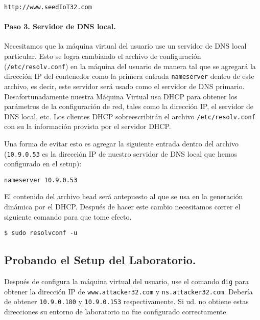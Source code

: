 \begin{lstlisting}
http://www.seedIoT32.com
\end{lstlisting}
 

\paragraph{Paso 3. Servidor de DNS local.}
Necesitamos que la máquina virtual del usuario use un servidor de DNS local particular.
Esto se logra cambiando el archivo de configuración (\texttt{/etc/resolv.conf}) en la máquina del usuario de manera tal que se agregará la dirección IP del contenedor como la primera entrada \texttt{nameserver} dentro de este archivo, es decir, este servidor será usado como el servidor de DNS primario.
Desafortunadamente nuestra Máquina Virtual usa DHCP para obtener los parámetros de la configuración de red, tales como la dirección IP, el servidor de DNS local, etc. Los clientes DHCP sobreescribirán el archivo \texttt{/etc/resolv.conf} con su la información provista por el servidor DHCP.

Una forma de evitar esto es agregar la siguiente entrada dentro del archivo   (\texttt{10.9.0.53} es la dirección IP de nuestro servidor de DNS local que hemos configurado en el setup):

\begin{lstlisting}
nameserver 10.9.0.53
\end{lstlisting}

El contenido del archivo head será antepuesto al que se usa en la generación dinámica por el DHCP. Después de hacer este cambio necesitamos correr el siguiente comando para que tome efecto.

\begin{lstlisting}
$ sudo resolvconf -u
\end{lstlisting}




\subsection{Probando el Setup del Laboratorio.}

Después de configura la máquina virtual del usuario, use el comando \texttt{dig} para obtener la dirección IP de \texttt{www.attacker32.com} y \texttt{ns.attacker32.com}. Debería de obtener \texttt{10.9.0.180} y \texttt{10.9.0.153} respectivamente. Si ud. no obtiene estas direcciones su entorno de laboratorio no fue configurado correctamente.

